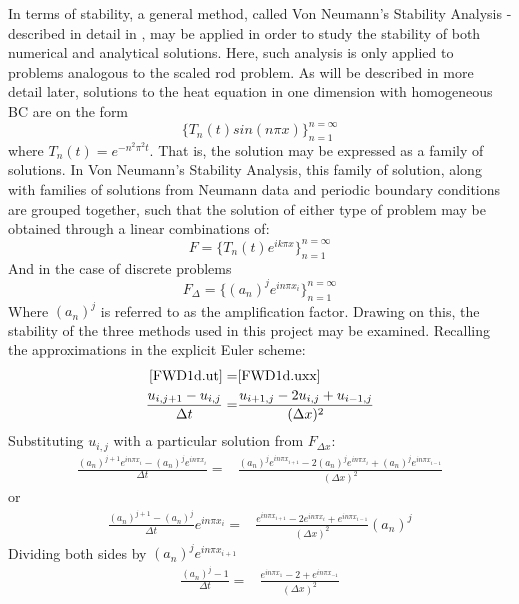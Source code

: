 \documentclass[%
oneside,                 %
final,                   %
10pt]{article}
\begin{document}
In terms of stability, a general method, called Von Neumann's Stability Analysis - described in detail in \citep[p.132-134]{compPDE}, may be applied in order to study the stability of both numerical and analytical solutions. Here, such analysis is only applied to problems analogous to the scaled rod problem. As will be described in more detail later, solutions to the heat equation in one dimension with homogeneous BC are on the form 
\begin{equation}
\{T_n(t) sin (n \pi x)\}_{n=1}^{n=\infty}
\end{equation}
where $T_n(t)=e^{-n^2\pi^2t}$. That is, the solution may be expressed as a family of solutions. In Von Neumann's Stability Analysis, this family of solution, along with families of solutions from  Neumann data and periodic boundary conditions are grouped together, such that the solution of either type of problem may be obtained through a linear combinations of:
\begin{equation}
F=\{T_n(t)e^{ik\pi x}\}_{n=1}^{n=\infty}
\end{equation} 
And in the case of discrete problems
\begin{equation}
F_\Delta=\{(a_n)^j e^{in\pi x_i}\}_{n=1}^{n=\infty}
\end{equation} 
Where $(a_n)^j$ is referred to as the amplification factor. Drawing on this, the stability of the three methods used in this project may be examined. Recalling the approximations in the explicit Euler scheme:
\begin{align*}
\eqref{FWD1d.ut} =& \eqref{FWD1d.uxx} \\
\frac{u_{i,j+1}- u_{i,j}}{\Delta t}=&\frac{u_{i+1,j} -2u_{i,j}+u_{i-1,j}}{(\Delta x)^2} 
\end{align*}
Substituting $u_{i,j}$ with a particular solution from $F_{\Delta x}$:
\begin{align*}
\frac{(a_n)^{j+1} e^{in\pi x_i}- (a_n)^j e^{in\pi x_i}}{\Delta t}=&\frac{(a_n)^j e^{in\pi x_{i+1}} -2(a_n)^j e^{in\pi x_i}+(a_n)^j e^{in\pi x_{i-1}}}{(\Delta x)^2} 
\end{align*}
or 
\begin{align*}
\frac{(a_n)^{j+1}- (a_n)^j }{\Delta t} e^{in\pi x_i}=&\frac{ e^{in\pi x_{i+1}} -2 e^{in\pi x_i}+ e^{in\pi x_{i-1}}}{(\Delta x)^2} (a_n)^j
\end{align*}
Dividing both sides by $(a_n)^j e^{in\pi x_{i+1}}$
\begin{align*}
\frac{(a_n)^{j}- 1 }{\Delta t} =&\frac{ e^{in\pi x_{1}} -2 + e^{in\pi x_{-1}}}{(\Delta x)^2}
\end{align*}
\end{document}
